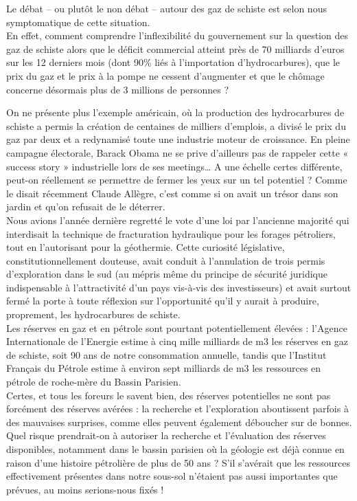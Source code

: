 \documentclass[8pt]{article}
\begin{document}
Le débat – ou plutôt le non débat – autour des gaz de schiste est selon nous symptomatique de cette situation.\\

En effet, comment comprendre l’inflexibilité du gouvernement sur la question des gaz de schiste alors que le déficit commercial atteint près de 70 milliards d’euros sur les 12 derniers mois (dont 90\% liés à l’importation d’hydrocarbures), que le prix du gaz et le prix à la pompe ne cessent d’augmenter et que le chômage concerne désormais plus de 3 millions de personnes ?

On ne présente plus l’exemple américain, où la production des hydrocarbures de schiste a permis la création de centaines de milliers d’emplois, a divisé le prix du gaz par deux et a redynamisé toute une industrie moteur de croissance. En pleine campagne électorale, Barack Obama ne se prive d’ailleurs pas de rappeler cette « success story » industrielle lors de ses meetings… A une échelle certes différente, peut-on réellement se permettre de fermer les yeux sur un tel potentiel ? Comme le disait récemment Claude Allègre, c’est comme si on avait un trésor dans son jardin et qu’on refusait de le déterrer.\\

Nous avions l’année dernière regretté le vote d’une loi par l’ancienne majorité qui interdisait la technique de fracturation hydraulique pour les forages pétroliers, tout en l’autorisant pour la géothermie. Cette curiosité législative, constitutionnellement douteuse, avait conduit à l’annulation de trois permis d’exploration dans le sud (au mépris même du principe de sécurité juridique indispensable à l’attractivité d’un pays vis-à-vis des investisseurs) et avait surtout fermé la porte à toute réflexion sur l’opportunité qu’il y aurait à produire, proprement, les hydrocarbures de schiste.\\

Les réserves en gaz et en pétrole sont pourtant potentiellement élevées : l’Agence Internationale de l’Energie estime à cinq mille milliards de m3 les réserves en gaz de schiste, soit 90 ans de notre consommation annuelle, tandis que l’Institut Français du Pétrole estime à environ sept milliards de m3 les ressources en pétrole de roche-mère du Bassin Parisien.\\

Certes, et tous les foreurs le savent bien, des réserves potentielles ne sont pas forcément des réserves avérées : la recherche et l’exploration aboutissent parfois à des mauvaises surprises, comme elles peuvent également déboucher sur de bonnes. Quel risque prendrait-on à autoriser la recherche et l’évaluation des réserves disponibles, notamment dans le bassin parisien où la géologie est déjà connue en raison d’une histoire pétrolière de plus de 50 ans ? S’il s’avérait que les ressources effectivement présentes dans notre sous-sol n’étaient pas aussi importantes que prévues, au moins serions-nous fixés !\\
\end{document}
